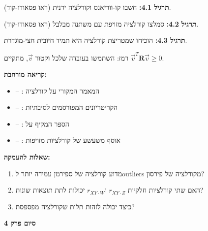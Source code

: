 \textbf{תרגיל \num{4.1}:} חשבו קו-ווריאנס וקורלציה ידנית (ראו פסאודו-קוד).

\textbf{תרגיל \num{4.2}:} סמלצו קורלציה מזויפת עם משתנה מבלבל (ראו פסאודו-קוד).

\textbf{תרגיל \num{4.3}:} הוכיחו שמטריצת קורלציה היא תמיד חיובית חצי-מוגדרת.

רמז: השתמשו בעובדה שלכל וקטור $\vec{v}$, מתקיים $\vec{v}^T \mathbf{R} \vec{v} \geq 0$.

\textbf{קריאה מורחבת:}

\begin{itemize}
\item \cite{pearson1896} – : המאמר המקורי על קורלציה
\item \cite{hill1965} – : הקריטריונים המפורסמים לסיבתיות
\item \cite{pearl2009} – : הספר המקיף על 
\item \cite{vigen2015} – : אוסף משעשע של קורלציות מזויפות
\end{itemize}

\textbf{שאלות להעמקה:}

\begin{enumerate}
\item מדוע קורלציה של ספירמן עמידה יותר ל\en{-}outliers מקורלציה של פירסון?
\item האם שתי קורלציות חלקיות $r_{XY \cdot Z}$ ו\en{-}$r_{XY \cdot W}$ יכולות לתת תוצאות שונות?
\item כיצד  יכולה לזהות תלות שקורלציה מפספסת?
\end{enumerate}

\textbf{סיום פרק \num{4}}